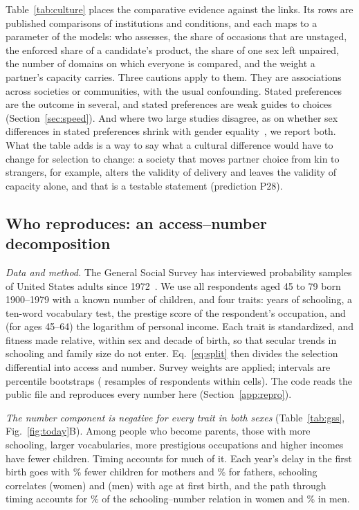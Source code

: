 Table~\ref{tab:culture} places the comparative evidence against the links. Its rows are published comparisons of
institutions and conditions, and each maps to a parameter of the models: who assesses, the share of occasions that are
unstaged, the enforced share of a candidate's product, the share of one sex left unpaired, the number of domains on which
everyone is compared, and the weight a partner's capacity carries. Three cautions apply to them. They are associations
across societies or communities, with the usual confounding. Stated preferences are the outcome in several, and stated
preferences are weak guides to choices (Section~\ref{sec:speed}). And where two large studies disagree, as on whether sex
differences in stated preferences shrink with gender equality~\cite{zentner2012,walter2020}, we report both. What the
table adds is a way to say what a cultural difference would have to change for selection to change: a society that moves
partner choice from kin to strangers, for example, alters the validity of delivery and leaves the validity of capacity
alone, and that is a testable statement (prediction P28).

\subsection{Who reproduces: an access--number decomposition}\label{sec:gss}

\emph{Data and method.} The General Social Survey has interviewed probability samples of United States adults since
1972~\cite{gss2024}. We use all \GssN{} respondents aged 45 to 79 born 1900--1979 with a known number of children, and four traits:
years of schooling, a ten-word vocabulary test, the prestige score of the respondent's occupation, and (for ages 45--64) the
logarithm of personal income. Each trait is standardized, and fitness made relative, within sex and decade of birth, so that
secular trends in schooling and family size do not enter. Eq.~\eqref{eq:split} then divides the selection differential into
access and number. Survey weights are applied; intervals are percentile bootstraps (\GssBoot{} resamples of respondents within
cells). The code reads the public file and reproduces every number here (Section~\ref{app:repro}).

\emph{The number component is negative for every trait in both sexes} (Table~\ref{tab:gss}, Fig.~\ref{fig:today}B). Among people who
become parents, those with more schooling, larger vocabularies, more prestigious occupations and higher incomes have fewer
children. Timing accounts for much of it. Each year's delay in the first birth goes with \GssTimSlopeW\% fewer children for
mothers and \GssTimSlopeM\% for fathers, schooling correlates \GssAfbRW{} (women) and \GssAfbRM{} (men) with age at first birth,
and the path through timing accounts for \GssTimShareW\% of the schooling--number relation in women and \GssTimShareM\% in men.

